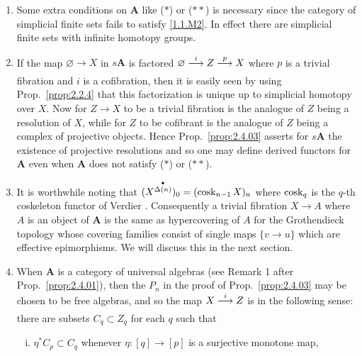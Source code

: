 \documentclass[../main]{subfiles}
\begin{document}
\begin{remarks*}
\begin{enumerate}
    \item Some extra conditions on $\mathbf{A}$ like ($\ast$) or ($\ast\ast$) is necessary since the category of simplicial finite sets fails to satisfy \ref{1.1.M2}. In effect there are simplicial finite sets with infinite homotopy groups. 
    
    \item If the map $\varnothing \longrightarrow X$ in $s\mathbf{A}$ is factored $\varnothing \varrightarrow i Z \varrightarrow p X$ where $p$ is a trivial fibration and $i$ is a cofibration, then it is easily seen by using Prop.\ \ref{prop:2.2.4} that this factorization is unique up to simplicial homotopy over $X$. Now for $Z \longrightarrow X$ to be a trivial fibration is the analogue of $Z$ being a resolution of $X$, while for $Z$ to be cofibrant is the analogue of $Z$ being a complex of projective objects. Hence Prop.\ \ref{prop:2.4.03} asserts for $s\mathbf{A}$ the existence of projective resolutions and so one may define derived functors for $\mathbf{A}$ even when $\mathbf{A}$ does not satisfy ($\ast$) or ($\ast\ast$).
    
    \item It is worthwhile noting that $(X^{\overset{\bullet}{\Delta(n)}})_0 = (\operatorname{cosk}_{n-1} X)_n$ where $\operatorname{cosk}_q$ is the $q$-th coskeleton functor of Verdier \cite{verdier_categories_nodate}. Consequently a trivial fibration $X \longrightarrow A$ where $A$ is an object of $\mathbf{A}$ is the same as hypercovering of $A$ for the Grothendieck topology whose covering families consist of single maps $\{v \longrightarrow u\}$ which are effective epimorphisms. We will discuss this in  the next section.
    
    \item When $\mathbf{A}$ is a category of universal algebras (see Remark 1 after Prop.\ \ref{prop:2.4.01}), then the $P_n$ in the proof of Prop.\ \ref{prop:2.4.03} may be chosen to be free algebras, and so the map $X \varrightarrow i Z$ is  in the following sense: there are subsets $C_q \subset Z_q$ for each $q$ such that 
    \begin{enumerate}[(i)]
        \item $\eta^* C_p \subset C_q$ whenever $\eta \colon [q] \longrightarrow [p]$ is a surjective monotone map,
        

\end{enumerate}
\end{enumerate}
\end{remarks*}
\end{document}
